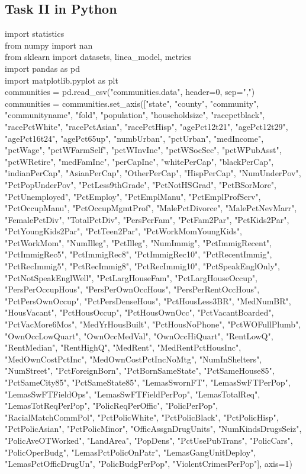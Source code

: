 \documentclass[10pt,a4paper]{article}
\begin{document}
	\subsection{Task II in Python}
	import statistics\\
	from numpy import nan\\
	from sklearn import datasets, linea\_model, metrics\\
	
	import pandas as pd\\
	import matplotlib.pyplot as plt\\
	
	communities = pd.read\_csv("communities.data", header=0, sep=",")\\
	communities = communities.set\_axis(["state", "county", "community", "communityname", "fold", "population", "householdsize", "racepctblack", "racePctWhite", "racePctAsian",
	"racePctHisp", "agePct12t21", "agePct12t29", "agePct16t24", "agePct65up", "numbUrban", "pctUrban", "medIncome", "pctWage", "pctWFarmSelf", 
	"pctWInvInc", "pctWSocSec", "pctWPubAsst", "pctWRetire", "medFamInc", "perCapInc",
	"whitePerCap", "blackPerCap", "indianPerCap", "AsianPerCap", "OtherPerCap", "HispPerCap", "NumUnderPov", "PctPopUnderPov", "PctLess9thGrade",
	"PctNotHSGrad", "PctBSorMore", "PctUnemployed", "PctEmploy", "PctEmplManu", "PctEmplProfServ", "PctOccupManu", "PctOccupMgmtProf", "MalePctDivorce",
	"MalePctNevMarr", "FemalePctDiv", "TotalPctDiv", "PersPerFam", "PctFam2Par", "PctKids2Par", "PctYoungKids2Par", "PctTeen2Par", "PctWorkMomYoungKids",
	"PctWorkMom", "NumIlleg", "PctIlleg", "NumImmig", "PctImmigRecent", "PctImmigRec5", "PctImmigRec8", "PctImmigRec10", "PctRecentImmig", "PctRecImmig5",
	"PctRecImmig8", "PctRecImmig10", "PctSpeakEnglOnly", "PctNotSpeakEnglWell", "PctLargHouseFam", "PctLargHouseOccup", "PersPerOccupHous", "PersPerOwnOccHous",
	"PersPerRentOccHous", "PctPersOwnOccup", "PctPersDenseHous", "PctHousLess3BR", "MedNumBR", "HousVacant", "PctHousOccup", "PctHousOwnOcc", "PctVacantBoarded", 
	"PctVacMore6Mos", "MedYrHousBuilt", "PctHousNoPhone", "PctWOFullPlumb", "OwnOccLowQuart", "OwnOccMedVal", "OwnOccHiQuart", "RentLowQ", "RentMedian",
	"RentHighQ", "MedRent", "MedRentPctHousInc", "MedOwnCostPctInc", "MedOwnCostPctIncNoMtg", "NumInShelters", "NumStreet", "PctForeignBorn", "PctBornSameState",
	"PctSameHouse85", "PctSameCity85", "PctSameState85", "LemasSwornFT", "LemasSwFTPerPop", "LemasSwFTFieldOps", "LemasSwFTFieldPerPop", "LemasTotalReq", 
	"LemasTotReqPerPop", "PolicReqPerOffic", "PolicPerPop", "RacialMatchCommPol", "PctPolicWhite", "PctPolicBlack", "PctPolicHisp", "PctPolicAsian", 
	"PctPolicMinor", "OfficAssgnDrugUnits", "NumKindsDrugsSeiz", "PolicAveOTWorked", "LandArea", "PopDens", "PctUsePubTrans", "PolicCars", "PolicOperBudg", 
	"LemasPctPolicOnPatr", "LemasGangUnitDeploy", "LemasPctOfficDrugUn", "PolicBudgPerPop", "ViolentCrimesPerPop"], axis=1)\\
	
\end{document}
